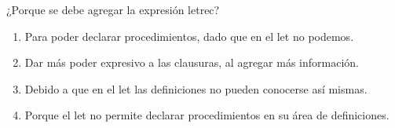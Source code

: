{
¿Porque se debe agregar la expresión letrec?

  \begin{enumerate}
\item Para poder declarar procedimientos, dado que en el let no podemos.
\item Dar más poder expresivo a las clausuras, al agregar más información.
\item Debido a que en el let las definiciones no pueden conocerse así mismas. %
\item Porque el let no permite declarar procedimientos en su área de definiciones.
  \end{enumerate}
      
}
